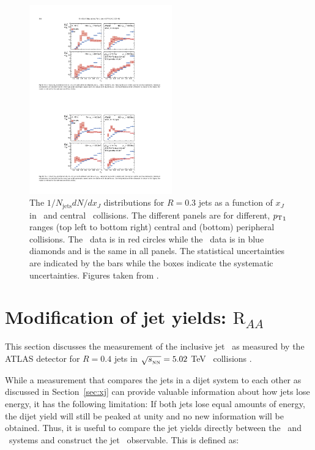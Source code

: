 \begin{figure}[htbp]
\begin{center}
\includegraphics[width=0.55\textwidth]{figures/jetMeasurements/xJ_R03}
\caption{The $1/N_\mathrm{jets} dN/dx_J$ distributions for $R=0.3$ jets as a function of $x_J$ in \pp\ and central \pbpb\ collisions. The different panels are for different, $\mbox{$p_{\mathrm{T}}$}_1$ ranges (top left to bottom right) central and (bottom) peripheral collisions. The \pbpb\ data is in red circles while the \pp\ data is in blue diamonds and is the same in all panels. The statistical uncertainties are indicated by the bars while the boxes indicate the systematic uncertainties. Figures taken from \cite{Aaboud:2017eww}.}
\label{fig:xJ_R03}
\end{center}
\end{figure}

\section{Modification of jet yields: $\mathrm{R}_{AA}$}
\label{sec:jet_raa}

This section discusses the measurement of the inclusive jet \RAA\ as measured by the ATLAS detector for $R=0.4$ jets in $\mbox{$\sqrt{s_{_\text{NN}}}$}=5.02$ TeV \pbpb\ collisions \cite{2019108}.

While a measurement that compares the jets in a dijet system to each other as discussed in Section~\ref{sec:xj} can provide valuable information about how jets lose energy, it has the following limitation: If both jets lose equal amounts of energy, the dijet yield will still be peaked at unity and no new information will be obtained. Thus, it is useful to compare the jet yields directly between the \pp\ and \pbpb\ systems and construct the jet \RAA\ observable. This is defined as:

